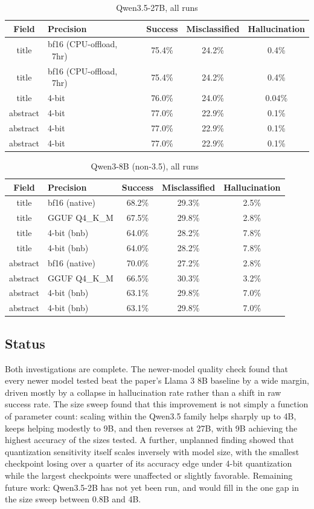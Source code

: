 \begin{table}[h]
\centering
\caption{Qwen3.5-27B, all runs}
\begin{tabular}{clccc}
\toprule
Field & Precision & Success & Misclassified & Hallucination \\
\midrule
title & bf16 (CPU-offload, ~7hr) & 75.4\% & 24.2\% & 0.4\% \\
title & bf16 (CPU-offload, ~7hr) & 75.4\% & 24.2\% & 0.4\% \\
title & 4-bit & 76.0\% & 24.0\% & 0.04\% \\
abstract & 4-bit & 77.0\% & 22.9\% & 0.1\% \\
abstract & 4-bit & 77.0\% & 22.9\% & 0.1\% \\
abstract & 4-bit & 77.0\% & 22.9\% & 0.1\% \\
\bottomrule
\end{tabular}
\end{table}

\begin{table}[h]
\centering
\caption{Qwen3-8B (non-3.5), all runs}
\label{tab:qwen8b-allruns}
\begin{tabular}{clccc}
\toprule
Field & Precision & Success & Misclassified & Hallucination \\
\midrule
title & bf16 (native) & 68.2\% & 29.3\% & 2.5\% \\
title & GGUF Q4\_K\_M & 67.5\% & 29.8\% & 2.8\% \\
title & 4-bit (bnb) & 64.0\% & 28.2\% & 7.8\% \\
title & 4-bit (bnb) & 64.0\% & 28.2\% & 7.8\% \\
abstract & bf16 (native) & 70.0\% & 27.2\% & 2.8\% \\
abstract & GGUF Q4\_K\_M & 66.5\% & 30.3\% & 3.2\% \\
abstract & 4-bit (bnb) & 63.1\% & 29.8\% & 7.0\% \\
abstract & 4-bit (bnb) & 63.1\% & 29.8\% & 7.0\% \\
\bottomrule
\end{tabular}
\end{table}

\subsection{Status}

Both investigations are complete. The newer-model quality check found that every newer model tested beat the paper's Llama 3 8B baseline by a wide margin, driven mostly by a collapse in hallucination rate rather than a shift in raw success rate. The size sweep found that this improvement is not simply a function of parameter count: scaling within the Qwen3.5 family helps sharply up to 4B, keeps helping modestly to 9B, and then reverses at 27B, with 9B achieving the highest accuracy of the sizes tested. A further, unplanned finding showed that quantization sensitivity itself scales inversely with model size, with the smallest checkpoint losing over a quarter of its accuracy edge under 4-bit quantization while the largest checkpoints were unaffected or slightly favorable. Remaining future work: Qwen3.5-2B has not yet been run, and would fill in the one gap in the size sweep between 0.8B and 4B.
